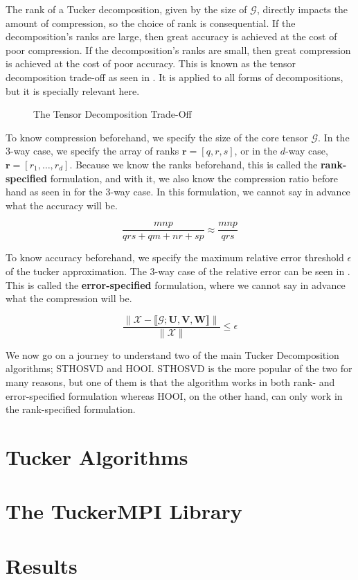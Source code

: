 
The rank of a Tucker decomposition, given by the size of $\mathcal{G}$, directly
impacts the amount of compression, so the choice of rank is consequential. If
the decomposition's ranks are large, then great accuracy is achieved at the cost
of poor compression. If the decomposition's ranks are small, then great
compression is achieved at the cost of poor accuracy. This is known as the
tensor decomposition trade-off as seen in
. It is applied to all forms of
decompositions, but it is specially relevant here. 

\begin{figure}[ht!]
    \centering
    
    \caption{The Tensor Decomposition Trade-Off}
    \label{fig:tensor_decomposition_trade_off}
\end{figure}

To know compression beforehand, we specify the size of the core tensor
$\mathcal{G}$. In the 3-way case, we specify the array of ranks $\mathbf{r} =
[q, r, s]$, or in the $d$-way case, $\mathbf{r} = [r_1, \hdots, r_d]$. Because
we know the ranks beforehand, this is called the \textbf{rank-specified}
formulation, and with it, we also know the compression ratio before hand as seen
in  for the 3-way case. In this formulation, we
cannot say in advance what the accuracy will be.

\begin{equation} \label{eq:compression_ratio}
    \frac{mnp}{qrs + qm + nr + sp} \approx \frac{mnp}{qrs}
\end{equation}

To know accuracy beforehand, we specify the maximum relative error threshold
$\epsilon$ of the tucker approximation. The 3-way case of the relative error can
be seen in . This is called the \textbf{error-specified}
formulation, where we cannot say in advance what the compression will be. 

\begin{equation} \label{eq:rel_error}
    \frac{\| \mathcal{X} - \llbracket \mathcal{G}; \mathbf{U, V, W} \rrbracket \|}{\|\mathcal{X}\|} \leq \epsilon
\end{equation}

We now go on a journey to understand two of the main Tucker Decomposition
algorithms; STHOSVD and HOOI. STHOSVD is the more popular of the two for many
reasons, but one of them is that the algorithm works in both rank- and
error-specified formulation whereas HOOI, on the other hand, can only work in
the rank-specified formulation. 


\section{Tucker Algorithms} \label{sec:Tucker Algorithms}
    

\section{The TuckerMPI Library} \label{sec:The TuckerMPI Library}
    

\section{Results} \label{sec:results}
    